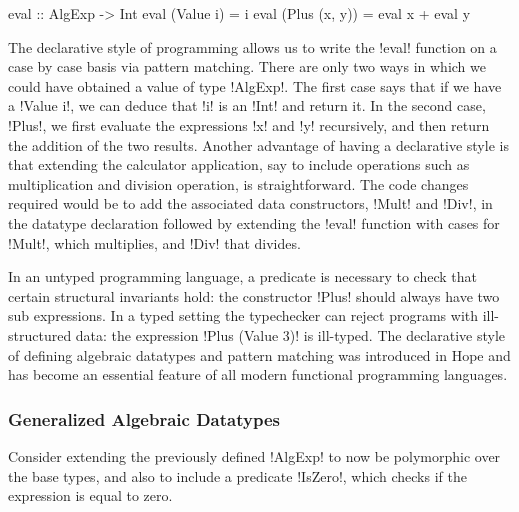 \documentclass[screen,nonacm]{acmart}
\begin{document}
\begin{CenteredBox}
\begin{code}
eval :: AlgExp -> Int
eval (Value i) = i
eval (Plus (x, y)) = eval x + eval y
\end{code}
\end{CenteredBox}

The declarative style of programming allows us to write the !eval! function on a case by case basis via pattern matching. There are only two ways in which we could have obtained a value of type !AlgExp!. The first case says that if we have a !Value i!, we can deduce that !i! is an !Int! and return it. In the second case, !Plus!, we first evaluate the expressions !x! and !y! recursively, and then return the addition of the two results. Another advantage of having a declarative style is that extending the calculator application, say to include operations such as multiplication and division operation, is straightforward. The code changes required would be to add the associated data constructors, !Mult! and !Div!, in the datatype declaration followed by extending the !eval! function with cases for !Mult!, which multiplies, and !Div! that divides.

In an untyped programming language, a predicate is necessary to check that certain structural invariants hold: the constructor !Plus! should always have two sub expressions. In a typed setting the typechecker can reject programs with ill-structured data: the expression !Plus (Value 3)! is ill-typed. The declarative style of defining algebraic datatypes and pattern matching was introduced in Hope\cite{burstall_proving_1969, burstall_hope_1980} and has become an essential feature of all modern functional programming languages.

\subsubsection{Generalized Algebraic Datatypes}
Consider extending the previously defined !AlgExp! to now be polymorphic over the base types, and also to include a predicate !IsZero!, which checks if the expression is equal to zero.
\end{document}
